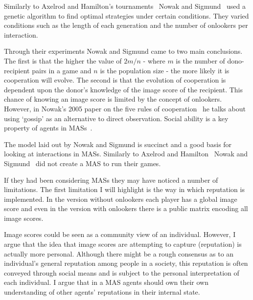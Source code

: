 \documentclass[]{final_report}
\begin{document}
Similarly to Axelrod and Hamilton's tournaments~\cite{evolution_of_cooperation} Nowak and Sigmund~\cite{evol_indirect_image} used a genetic algorithm to find optimal strategies under certain conditions. They varied conditions such as the length of each generation and the number of onlookers per interaction.\par 
Through their experiments Nowak and Sigmund came to two main conclusions. The first is that the higher the value of $2m/n$ - where $m$ is the number of dono-recipient pairs in a game and $n$ is the population size - the more likely it is cooperation will evolve. The second is that the evolution of cooperation is dependent upon the donor's knowledge of the image score of the recipient. This chance of knowing an image score is limited by the concept of onlookers. However, in Nowak's 2005 paper on the five rules of cooperation~\cite{five_rules_coop} he talks about using `gossip' as an alternative to direct observation. Social ability is a key property of agents in MASs~\cite{wooldridge_jennings_1995}.\par 
The model laid out by Nowak and Sigmund is succinct and a good basis for looking at interactions in MASs. Similarly to Axelrod and Hamilton~\cite{evolution_of_cooperation} Nowak and Sigmund~\cite{evol_indirect_image} did not create a MAS to run their games.\par
If they had been considering MASs they may have noticed a number of limitations. The first limitation I will highlight is the way in which reputation is implemented. In the version without onlookers each player has a global image score and even in the version with onlookers there is a public matrix encoding all image scores.\par
Image scores could be seen as a community view of an individual. However, I argue that the idea that image scores are attempting to capture (reputation) is actually more personal. Although there might be a rough consensus as to an individual's general reputation among people in a society, this reputation is often conveyed through social means and is subject to the personal interpretation of each individual. I argue that in a MAS agents should own their own understanding of other agents' reputations in their internal state.
\end{document}
